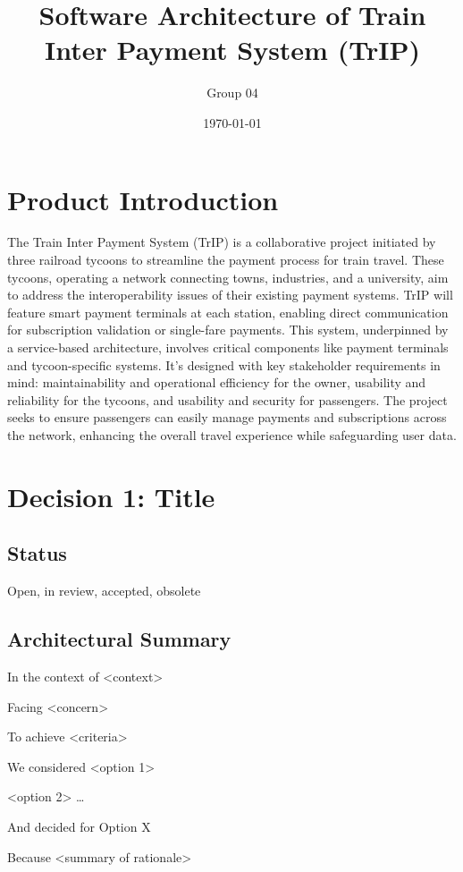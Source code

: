 \documentclass{article}
\title{Software Architecture of Train Inter Payment System (TrIP)}
\author{Group 04}
\date{\today}
\begin{document}
\maketitle
\newpage

\section*{Product Introduction}
The Train Inter Payment System (TrIP) is a collaborative project initiated by three railroad tycoons to streamline the payment process for train travel. These tycoons, operating a network connecting towns, industries, and a university, aim to address the interoperability issues of their existing payment systems. TrIP will feature smart payment terminals at each station, enabling direct communication for subscription validation or single-fare payments. This system, underpinned by a service-based architecture, involves critical components like payment terminals and tycoon-specific systems. It's designed with key stakeholder requirements in mind: maintainability and operational efficiency for the owner, usability and reliability for the tycoons, and usability and security for passengers. The project seeks to ensure passengers can easily manage payments and subscriptions across the network, enhancing the overall travel experience while safeguarding user data.

\newpage
\section*{Decision 1: Title}
\subsection*{Status}
Open, in review, accepted, obsolete

\subsection*{Architectural Summary}
In the context of \textless{}context\textgreater{}

Facing \textless{}concern\textgreater{}

To achieve \textless{}criteria\textgreater{}

We considered \textless{}option 1\textgreater{}

\textless{}option 2\textgreater{} \ldots

And decided for Option X

Because \textless{}summary of rationale\textgreater{}
\end{document}
